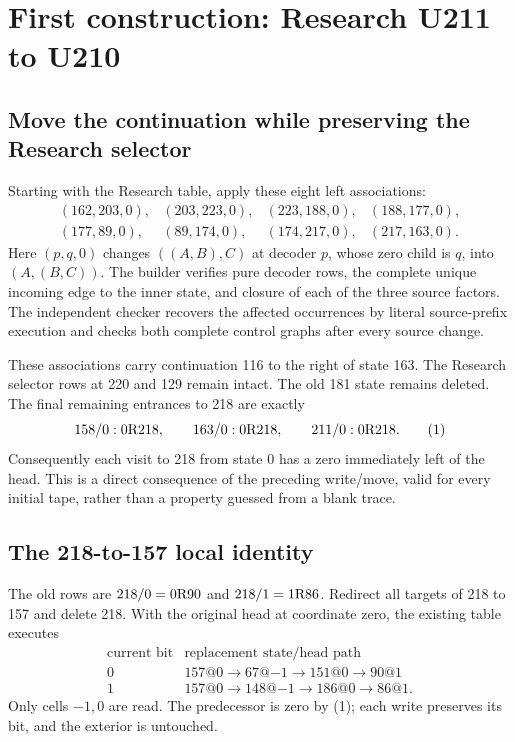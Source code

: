 \section{First construction: Research U211 to U210}\label{sec:u210}

\subsection{Move the continuation while preserving the Research selector}
Starting with the Research table, apply these eight left associations:
\[
\begin{array}{rrrr}
(162,203,0),&(203,223,0),&(223,188,0),&(188,177,0),\\
(177,89,0),&(89,174,0),&(174,217,0),&(217,163,0).
\end{array}
\]
Here \((p,q,0)\) changes \(((A,B),C)\) at decoder \(p\), whose zero child is
\(q\), into \((A,(B,C))\). The builder verifies pure decoder rows, the complete
unique incoming edge to the inner state, and closure of each of the three
source factors. The independent checker recovers the affected occurrences
by literal source-prefix execution and checks both complete control graphs
after every source change.

These associations carry continuation 116 to the right of state 163.
The Research selector rows at 220 and 129 remain intact.
The old 181 state remains deleted. The final remaining entrances to 218 are
exactly
\[
 158/0:0\mathrm{R}218,\qquad
 163/0:0\mathrm{R}218,\qquad
 211/0:0\mathrm{R}218.
 \tag{1}
\]
Consequently each visit to 218 from state 0 has a zero immediately left of
the head. This is a direct consequence of the preceding write/move, valid
for every initial tape, rather than a property guessed from a blank trace.

\subsection{The 218-to-157 local identity}
The old rows are \(218/0=0\mathrm{R}90\) and \(218/1=1\mathrm{R}86\).
Redirect all targets of 218 to 157 and delete 218. With the original head at
coordinate zero, the existing table executes
\[
\begin{array}{c|l}
\text{current bit}&\text{replacement state/head path}\\
\hline
0&157@0\to67@{-1}\to151@0\to90@1\\
1&157@0\to148@{-1}\to186@0\to86@1.
\end{array}
\tag{2}
\]
Only cells \(-1,0\) are read. The predecessor is zero by (1);
each write preserves its bit, and the exterior is untouched.

